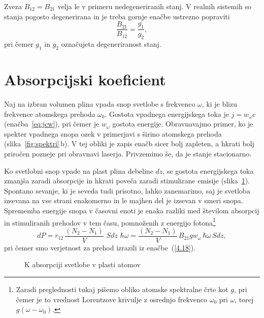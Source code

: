 \begin{remark}
 Zveza $B_{12}=B_{21}$ velja le v primeru nedegeneriranih stanj. V realnih sistemih
 so stanja pogosto degenerirana in je treba gornje enačbe ustrezno popraviti
\begin{equation}
\frac{B_{21}}{B_{12}} = \frac{g_1}{g_2},
\label{eq:ABdeg}
\end{equation}
pri čemer $g_{1}$ in $g_2$ označujeta degeneriranost stanj. 
\end{remark}

\section{Absorpcijski koeficient}
Naj na izbran volumen plina vpada snop svetlobe s frekvenco
$\omega$, ki je blizu frekvence atomskega prehoda $\omega_{0}$. Gostota
vpadnega energijskega toka je $j=w_{\omega}c$ (enačba~\ref{eq:jcw}), 
pri čemer je $w_{\omega}$ gostota energije. Obravnavajmo primer, ko je 
spekter vpadnega snopa ozek v primerjavi s širino atomskega prehoda
(slika~\ref{fig:spektri}\,b). V tej obliki je zapis enačb sicer bolj zapleten,
a hkrati bolj priročen pozneje pri obravnavi laserja. Privzemimo še, da
je stanje stacionarno. 

Ko svetlobni snop vpade na plast plina debeline $dz$, se gostota
energijskega toka zmanjša zaradi absorpcije in hkrati poveča zaradi 
stimulirane emisije (slika~\ref{fig:abs}). 
Spontano sevanje, ki je seveda tudi prisotno, lahko zanemarimo, saj
je svetloba izsevana na vse strani enakomerno in le majhen del je izsevan v smeri snopa.
Sprememba energije snopa v časovni enoti je enaka razliki med 
številom absorpcij in stimuliranih prehodov v tem času, pomnoženih z 
energijo fotona\footnote{Zaradi preglednosti tukaj pišemo obliko atomske spektralne črte kot $g$, 
pri čemer je to vrednost Lorentzove krivulje z osrednjo frekvenco $\omega_0$ pri $\omega$, 
torej $g(\omega-\omega_0)$.}
\begin{equation}
dP=r_{12}\,\frac{(N_{2}-N_{1})}{V}\,\,S dz\, \, \hbar\omega = 
\frac{(N_{2}-N_{1})}{V}\,B_{21}g w_{\omega} \, \hbar\omega \,S dz,
\label{4.28}
\end{equation}
pri čemer smo verjetnost za prehod izrazili iz 
enačbe~(\ref{4.18}).
\begin{figure}[h]
\centering
\def\svgwidth{70truemm} 

\caption{K absorpciji svetlobe v plasti atomov}
\label{fig:abs}
\end{figure}


